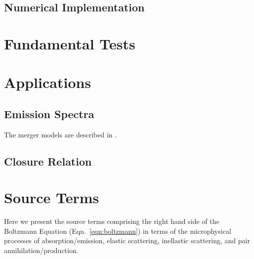 \documentclass[aps,prd,twocolumn,superscriptaddress,groupedaddress]{revtex4}
\begin{document}
\subsection{Numerical Implementation}
\label{sec:numerical}

\section{Fundamental Tests}
\label{sec:tests}

\section{Applications}
\label{sec:applications}

\subsection{Emission Spectra}
\label{ssec:spectra}
The merger models are described in \cite{fouc2015-m1_nsbh, fouc2016-m1_nsns}.

\subsection{Closure Relation}
\label{ssec:closure}

\appendix

\section{Source Terms}
\label{sec:source_terms}
Here we present the source terms comprising the right hand side of the
Boltzmann Equation (Eqn.~\ref{eqn:boltzmann}) in terms of the microphysical
processes of absorption/emission, elastic scattering, inellastic scattering,
and pair annihilation/production.


\end{document}
